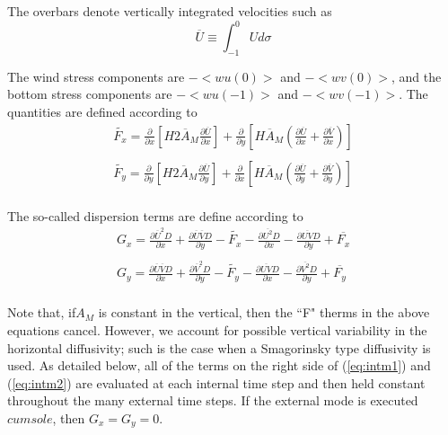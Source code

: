 \documentclass[oribibl]{llncs}
\begin{document}
The overbars denote vertically integrated velocities such as
\begin{equation}
\overline{U} \equiv \int_{-1}^{0} U d \sigma
\end{equation}	

The wind stress components are $-<wu(0)>$  and $-<wv(0)> $, and the bottom stress components are $-<wu(-1)>$  and $-<wv(-1)> $. The quantities are defined according to
\begin{eqnarray}
\tilde{F_x}=\frac{\partial}{\partial x} \left[ H2 \overline{A}_M \frac{\partial \overline{U}}{\partial x} \right] +\frac{\partial}{\partial y} \left[ H \overline{A}_M \left( \frac{\partial \overline{U}}{\partial x} + \frac{\partial \overline{V}}{\partial x}\right) \right] \\
\nonumber\\
\tilde{F_y}=\frac{\partial}{\partial y} \left[ H2 \overline{A}_M \frac{\partial \overline{U}}{\partial y} \right] +\frac{\partial}{\partial x} \left[ H \overline{A}_M \left( \frac{\partial \overline{U}}{\partial y} + \frac{\partial \overline{V}}{\partial y}\right) \right] \\
\end{eqnarray}

The so-called dispersion terms are define according to
\begin{eqnarray}
G_x=\frac{\partial \overline{U}^2 D}{\partial x} +\frac{\partial \overline{U} \overline{V} D}{\partial y} -  \tilde{F_x} - \frac{\partial \overline{U^2} D}{\partial x} -\frac{\partial \overline{UV} D}{\partial y} + \overline{F_x}\\
\nonumber\\
G_y=\frac{\partial \overline{U}\overline{V} D}{\partial x} +\frac{\partial \overline{V} ^2 D}{\partial y} -  \tilde{F_y} - \frac{\partial \overline{UV} D}{\partial x} -\frac{\partial \overline{V^2} D}{\partial y} + \overline{F_y}\\
\end{eqnarray}

Note that, if$ A_M$ is constant in the vertical, then the ``F" therms in the above equations cancel. However, we account for possible vertical variability in the horizontal diffusivity; such is the case when a Smagorinsky type diffusivity is used. As detailed below, all of the terms on the right side of (\ref{eq:intm1}) and (\ref{eq:intm2}) are evaluated at each internal time step and then held constant throughout the many external time steps. If the external mode is executed $cum sole$, then $G_x=G_y=0$.
\end{document}
